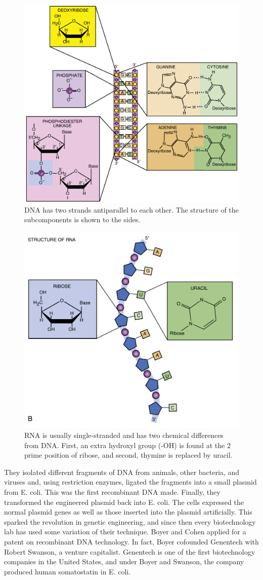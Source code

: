 \documentclass[nofonts,]{tufte-handout}
\begin{document}
\begin{figure}
\includegraphics[width=0.7\linewidth]{./images/dna_structure_a} \caption[DNA has two strands antiparallel to each other]{DNA has two strands antiparallel to each other. The structure of the subcomponents is shown to the sides.}\label{fig:nucleic-acid}
\end{figure}
\begin{figure}
\includegraphics[width=0.7\linewidth]{./images/dna_structure_b} \caption[RNA is usually single-stranded and has two chemical differences from DNA]{RNA is usually single-stranded and has two chemical differences from DNA. First, an extra hydroxyl group (-OH) is found at the 2 prime position of ribose, and second, thymine is replaced by uracil.}\label{fig:nucleic-acid}
\end{figure}

They isolated different fragments of DNA from animals, other bacteria,
and viruses and, using restriction enzymes, ligated the fragments into a
small plasmid from E. coli. This was the first recombinant DNA made.
Finally, they transformed the engineered plasmid back into E. coli. The
cells expressed the normal plasmid genes as well as those inserted into
the plasmid artificially. This sparked the revolution in genetic
engineering, and since then every biotechnology lab has used some
variation of their technique. Boyer and Cohen applied for a patent on
recombinant DNA technology. In fact, Boyer cofounded Genentech with
Robert Swanson, a venture capitalist. Genentech is one of the first
biotechnology companies in the United States, and under Boyer and
Swanson, the company produced human somatostatin in E. coli.
\end{document}
